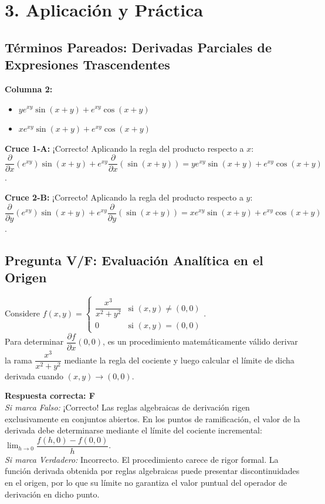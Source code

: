 \documentclass[11pt]{article}
\newenvironment{aplicacion}{%
  \section*{3. Aplicación y Práctica}%
}{}
\newenvironment{preguntaverdaderofalso}[1]{\subsection*{Pregunta V/F: #1}\par\vspace{0.1cm}}{\vspace{0.3cm}}
\newcommand{\verdaderofalso}[3]{\par\noindent\textbf{Respuesta correcta: #1} \\ \textit{Si marca Falso:} #2 \\ \textit{Si marca Verdadero:} #3\par\vspace{0.15cm}}
\newenvironment{pareados}[1]{\subsection*{Términos Pareados: #1}}{\vspace{0.3cm}}
\newcommand{\columnaII}[1]{\textbf{Columna 2:}\begin{itemize}#1\end{itemize}}
\newcommand{\pareo}[2]{\textbf{Cruce #1:} #2\par}
\begin{document}
\begin{aplicacion}
\begin{pareados}{Derivadas Parciales de Expresiones Trascendentes}
    \columnaII{
      \item $y e^{xy} \sin(x+y) + e^{xy} \cos(x+y)$
      \item $x e^{xy} \sin(x+y) + e^{xy} \cos(x+y)$
    }

    \pareo{1-A}{¡Correcto! Aplicando la regla del producto respecto a $x$: $\dfrac{\partial}{\partial x}(e^{xy})\sin(x+y) + e^{xy}\dfrac{\partial}{\partial x}(\sin(x+y)) = y e^{xy}\sin(x+y) + e^{xy}\cos(x+y)$.}
    \pareo{2-B}{¡Correcto! Aplicando la regla del producto respecto a $y$: $\dfrac{\partial}{\partial y}(e^{xy})\sin(x+y) + e^{xy}\dfrac{\partial}{\partial y}(\sin(x+y)) = x e^{xy}\sin(x+y) + e^{xy}\cos(x+y)$.}
  \end{pareados}

  \begin{preguntaverdaderofalso}{Evaluación Analítica en el Origen}
    Considere $f(x,y) = \begin{cases} \displaystyle \dfrac{x^3}{x^2+y^2} & \text{si } (x,y) \neq (0,0) \\[1em] 0 & \text{si } (x,y) = (0,0) \end{cases}$. \\
    Para determinar $\displaystyle \dfrac{\partial f}{\partial x}(0,0)$, es un procedimiento matemáticamente válido derivar la rama $\dfrac{x^3}{x^2+y^2}$ mediante la regla del cociente y luego calcular el límite de dicha derivada cuando $(x,y) \to (0,0)$.
    
    \verdaderofalso{F}
      {¡Correcto! Las reglas algebraicas de derivación rigen exclusivamente en conjuntos abiertos. En los puntos de ramificación, el valor de la derivada debe determinarse mediante el límite del cociente incremental: $\lim_{h \to 0} \dfrac{f(h,0) - f(0,0)}{h}$.}
      {Incorrecto. El procedimiento carece de rigor formal. La función derivada obtenida por reglas algebraicas puede presentar discontinuidades en el origen, por lo que su límite no garantiza el valor puntual del operador de derivación en dicho punto.}
  \end{preguntaverdaderofalso}

\end{aplicacion}
\end{document}
